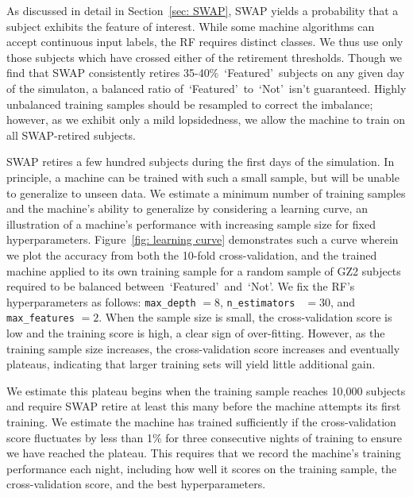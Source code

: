 \documentclass[twocolumn]{aastex6}
\newcommand{\feat}{`Featured'}
\newcommand{\notfeat}{`Not'}
\begin{document}
As discussed in detail in Section~\ref{sec: SWAP}, SWAP yields a probability that 
a subject exhibits the feature of interest. While some machine algorithms can 
accept continuous input labels, the RF requires distinct classes. We thus use only 
those subjects which have crossed either of the retirement thresholds. 
Though we find that SWAP consistently retires 35-40\%~\feat~subjects on 
any given day of the simulaton, a balanced ratio of~\feat~to~\notfeat~isn't guaranteed.
 Highly unbalanced training samples should be resampled to correct the imbalance; 
however, as we exhibit only a mild lopsidedness, we allow the machine to train on all 
SWAP-retired subjects.  

SWAP retires a few hundred subjects during the first days of the simulation.
In principle,  a machine can be trained with such a small sample, but will be unable
to generalize to unseen data. We estimate a minimum number of training samples
and the machine's ability to generalize by considering a learning curve, an illustration
of a machine's performance with increasing sample size for fixed hyperparameters. 
Figure~\ref{fig: learning curve} demonstrates such a curve wherein we plot
the accuracy from both the 10-fold cross-validation, and the trained machine
applied to its own training sample for a random sample of GZ2 subjects
required to be balanced between~\feat~and~\notfeat.  
We fix the RF's hyperparameters as follows: \texttt{max\_depth} $=8$, 
\texttt{n\_estimators } $=30$, and \texttt{max\_features} $=2$. 
When the sample size is small, the cross-validation score is low and the training 
score is high, a clear sign of over-fitting.  However, as the training 
sample size increases, the cross-validation score increases and eventually plateaus,
 indicating that larger training sets will yield little additional gain. 

We estimate this plateau begins when the training 
sample reaches 10,000 subjects and require SWAP retire at least this many 
 before the machine attempts its first training.  We estimate the machine 
has trained sufficiently if the cross-validation score fluctuates by less than 1\% 
for three consecutive nights of training to ensure we have reached the plateau.  
This requires that we record the machine's training performance each night, 
including how well it scores on the training sample, the 
cross-validation score, and the best hyperparameters. 
\end{document}
